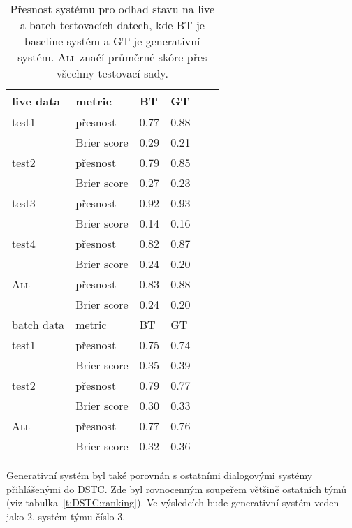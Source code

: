 \begin{table}[htb]
\begin{center}
\begin{tabular}{|l|l|l|l|l|l|}
  \hline
live data & metric      & BT & GT \\
\hline
test1 & přesnost    & 0.77 & 0.88 \\
        & Brier score & 0.29 & 0.21 \\
\hline
test2 & přesnost    & 0.79 & 0.85 \\
        & Brier score & 0.27 & 0.23 \\
\hline
test3  & přesnost    & 0.92 & 0.93 \\
        & Brier score & 0.14 & 0.16 \\
\hline
test4  & přesnost    & 0.82 & 0.87 \\
        & Brier score & 0.24 & 0.20 \\
\hline
\textsc{All}    & přesnost    & 0.83 & 0.88 \\
        & Brier score & 0.24 & 0.20 \\
\hline
\hline
batch data & metric      & BT & GT \\
\hline
test1 & přesnost    & 0.75 & 0.74 \\
        & Brier score & 0.35 & 0.39 \\
\hline
test2 & přesnost    & 0.79 & 0.77 \\
        & Brier score & 0.30 & 0.33 \\
\hline
\textsc{All}    & přesnost    & 0.77 & 0.76 \\
        & Brier score & 0.32 & 0.36 \\
\hline
\end{tabular}
\end{center}
\caption{Přesnost systému pro odhad stavu na live a batch testovacích datech, kde BT je baseline systém a GT je generativní systém. \textsc{All} značí průměrné skóre přes všechny testovací sady.}
\label{t:all:datasets}
\end{table}

Generativní systém byl také porovnán s ostatními dialogovými systémy přihlášenými do DSTC.
Zde byl rovnocenným soupeřem většině ostatních týmů (viz tabulka~\ref{t:DSTC:ranking}).
Ve výsledcích bude generativní systém veden jako 2. systém týmu číslo 3.

